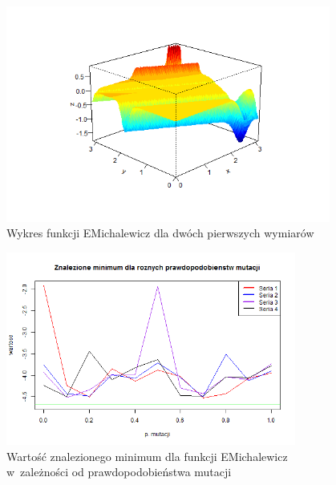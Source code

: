 \documentclass[11pt, a4paper]{article}
\begin{document}
\begin{figure}[H]
	\begin{center}
		\includegraphics[width=0.95\textwidth]{./assets/EMichalewicz1.png}
		\caption{Wykres funkcji EMichalewicz dla dwóch pierwszych wymiarów}
		\label{fig:emichalewicz1}
	\end{center}
\end{figure}

\begin{figure}[H]
	\begin{center}
		\includegraphics[width=0.85\textwidth]{./assets/EMichalewicz2.png}
		\caption{Wartość znalezionego minimum dla funkcji EMichalewicz w~zależności od prawdopodobieństwa mutacji}
		\label{fig:emichalewicz2}
	\end{center}
\end{figure}
\end{document}
